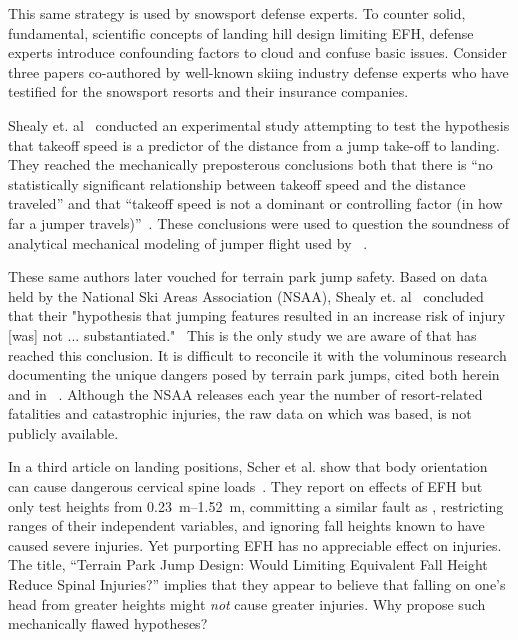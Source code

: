 \documentclass[smallextended]{svjour3}       %
\begin{document}
This same strategy is used by
snowsport defense experts. To counter solid, fundamental, scientific concepts
of landing hill design limiting EFH, defense experts introduce confounding
factors to cloud and confuse basic issues. Consider three papers \cite{Shealy2010,Shealy2015,Scher2015} co-authored by well-known 
skiing industry defense experts who have testified for the snowsport resorts and their
insurance companies. 

Shealy et. al~\cite{Shealy2010} conducted an experimental
study attempting to test the hypothesis that takeoff speed is a predictor
of the distance from a jump take-off to landing. They reached the
mechanically preposterous conclusions both that there is ``no statistically
significant relationship between takeoff speed and the distance traveled'' and
that ``takeoff speed is not a dominant or controlling factor (in how far a
jumper travels)''~\cite{Shealy2010}. These conclusions were used to question the soundness of
analytical mechanical modeling of jumper flight used by ~\cite{Hubbard2009,McNeil2012}. 

These same authors later vouched for terrain park jump safety. Based on data held by the National Ski Areas Association (NSAA), Shealy et. al~\cite{Shealy2015} concluded that their "hypothesis that jumping features resulted in an increase risk of injury [was] not ... substantiated."~\cite{Shealy2015} This is the only study we are aware of that has reached this conclusion. It is difficult to reconcile it with the voluminous research documenting the unique dangers posed by terrain park jumps, cited both herein and in ~\cite{Hubbard2009,Swedberg2012,McNeil2012,McNeil2012a,Hubbard2015,Levy2015,Petrone2017,Moore2018}. Although the NSAA releases each year the number of resort-related fatalities and catastrophic injuries, the raw data on which \cite{Shealy2015} was based, is not publicly available.

In a third article on landing positions, Scher et al. show that body orientation can
cause dangerous cervical spine loads~\cite{Scher2015}. They report on effects
of EFH but only test heights from \SIrange{0.23}{1.52}{\meter}, committing a
similar fault as \cite{Shealy2010}, restricting ranges of their independent
variables, and ignoring fall heights known to have caused severe injuries. Yet
purporting EFH has no appreciable effect on injuries. The title, ``Terrain
Park Jump Design: Would Limiting Equivalent Fall Height Reduce Spinal
Injuries?'' implies that they appear to believe that falling on one's head from
greater heights might \emph{not} cause greater injuries.  Why propose such
mechanically flawed hypotheses?
\end{document}

